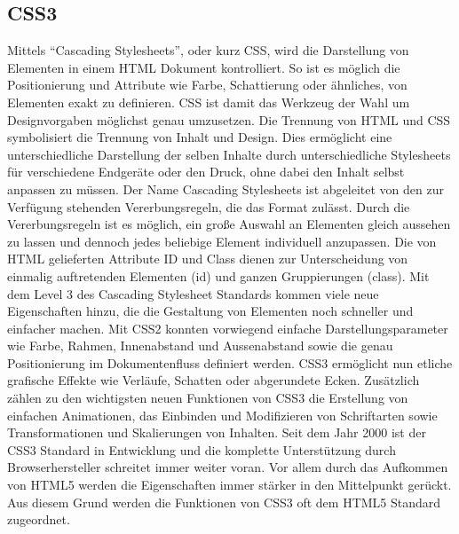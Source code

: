 \subsection{CSS3}
Mittels ``Cascading Stylesheets'', oder kurz CSS, wird die Darstellung von
Elementen in einem HTML Dokument kontrolliert. So ist es möglich die
Positionierung und Attribute wie Farbe, Schattierung oder ähnliches, von
Elementen exakt zu definieren. CSS ist damit das Werkzeug der Wahl um
Designvorgaben möglichst genau umzusetzen.
\newline\newline
Die Trennung von HTML und CSS symbolisiert die Trennung von Inhalt und
Design. Dies ermöglicht eine unterschiedliche Darstellung der selben Inhalte
durch unterschiedliche Stylesheets für verschiedene Endgeräte oder den Druck,
ohne dabei den Inhalt selbst anpassen zu müssen.
\newline\newline
Der Name Cascading Stylesheets ist abgeleitet von den zur Verfügung stehenden
Vererbungsregeln, die das Format zulässt. Durch die Vererbungsregeln ist es
möglich, ein große Auswahl an Elementen gleich aussehen zu lassen und
dennoch jedes beliebige Element individuell anzupassen. Die von
HTML gelieferten Attribute ID und Class dienen zur Unterscheidung von
einmalig auftretenden Elementen (id) und ganzen Gruppierungen (class).
\newline\newline
Mit dem Level 3 des Cascading Stylesheet Standards kommen viele neue
Eigenschaften hinzu, die die Gestaltung von Elementen noch schneller und
einfacher machen. Mit CSS2 konnten vorwiegend einfache Darstellungsparameter
wie Farbe, Rahmen, Innenabstand und Aussenabstand sowie die genau
Positionierung im Dokumentenfluss definiert werden. CSS3 ermöglicht nun
etliche grafische Effekte wie Verläufe, Schatten oder abgerundete Ecken.
Zusätzlich zählen zu den wichtigsten neuen Funktionen von CSS3 die Erstellung
von einfachen Animationen, das Einbinden und Modifizieren von Schriftarten
sowie Transformationen und Skalierungen von Inhalten.
\newline\newline
Seit dem Jahr 2000 ist der CSS3 Standard in Entwicklung und die komplette
Unterstützung durch Browserhersteller schreitet immer weiter voran. Vor
allem durch das Aufkommen von HTML5 werden die Eigenschaften immer stärker in
den Mittelpunkt gerückt. Aus diesem Grund werden die Funktionen von CSS3 oft
dem HTML5 Standard zugeordnet.

